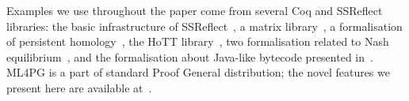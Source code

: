 Examples we use throughout the paper come from several Coq and SSReflect libraries: the basic infrastructure of SSReflect~\cite{SSReflect}, a matrix library~\cite{GarillotEtAl09}, a formalisation of persistent homology~\cite{HCMS12}, the HoTT library~\cite{hottbook}, two formalisation related to Nash equilibrium~\cite{Ves06,nash}, and the formalisation about Java-like bytecode presented in~\cite{HK14}. ML4PG is a part of standard Proof General distribution; the novel features we present here are available at~\cite{HK12}. %





 




















